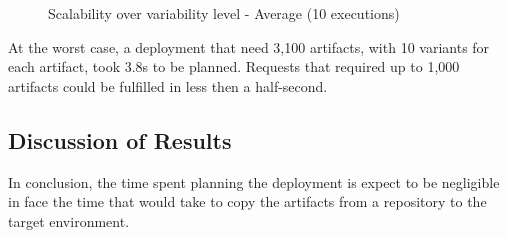 \begin{figure}[!htb]
  \centering
  \caption{Scalability over variability level - Average (10 executions)}
\label{graph_scalability}
\end{figure}

At the worst case, a deployment that need 3,100 artifacts, with 10 variants for each artifact, took 3.8s to be planned. Requests that required up to 1,000 artifacts could be fulfilled in less then a half-second.

\subsection{Discussion of Results}

In conclusion, the time spent planning the deployment is expect to be negligible in face the time that would take to copy the artifacts from a repository to the target environment.
